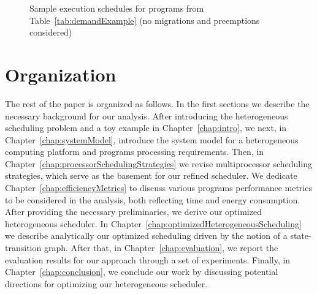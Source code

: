 \begin{figure}
\caption{Sample execution schedules for programs from Table~\ref{tab:demandExample} (no migrations and preemptions considered)}
\label{fig:twoSchedulesExample}
\vspace{-3mm}
\end{figure}

\section{Organization} 
The rest of the paper is organized as follows. In the first sections we describe the necessary background for our analysis. After introducing the heterogeneous scheduling problem and a toy example in Chapter~\ref{chap:intro}, we next, in Chapter~\ref{chap:systemModel}, introduce the system model for a heterogeneous computing platform and programs processing requirements. Then, in Chapter~\ref{chap:processorSchedulingStrategies} we revise multiprocessor scheduling strategies, which serve as the basement for our refined scheduler. We dedicate Chapter~\ref{chap:efficiencyMetrics} to discuss various programs performance metrics to be considered in the analysis, both reflecting time and energy consumption. After providing the necessary preliminaries, we derive our optimized heterogeneous scheduler. In Chapter~\ref{chap:optimizedHeterogeneousScheduling} we describe analytically our optimized scheduling driven by the notion of a state-transition graph. After that, in Chapter~\ref{chap:evaluation}, we report the evaluation results for our approach through a set of experiments. Finally, in Chapter~\ref{chap:conclusion}, we conclude our work by discussing potential directions for optimizing our heterogeneous scheduler.
